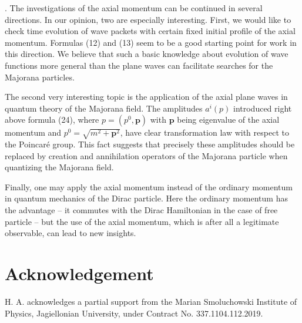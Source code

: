 \documentclass[12pt]{article}
\begin{document}
.   The  investigations of the axial momentum can be continued in several directions.  In our opinion, two are especially interesting. First,  we would like to check  time evolution of wave packets with certain fixed initial profile of the axial momentum.  Formulas (12) and (13) seem to be a good starting point for  work in this direction.  We believe that such a basic knowledge about evolution of wave functions more general than the plane waves can  facilitate searches for  the Majorana particles. 

The second  very interesting topic is the application of the axial plane waves  in quantum theory of the Majorana field. 
The amplitudes  $a^i(p)$ introduced right above formula (24),  where $p=(p^0, \mathbf{p})$ with  $\mathbf{p}$ being eigenvalue of the axial momentum and  $p^0 = \sqrt{m^2 + \mathbf{p}^2}$,   have clear transformation law with respect to the Poincar\'e  group.  This fact suggests that  precisely these amplitudes should be replaced by  creation and annihilation operators of the Majorana particle when quantizing the Majorana field. 

Finally, one may apply the axial momentum instead of the ordinary momentum in quantum mechanics of the Dirac particle.    Here the ordinary momentum    has the advantage -- it commutes  with the Dirac Hamiltonian  in the case of  free particle  --  but the use of  the axial momentum, which is after all  a legitimate observable,  can lead to new insights. 



\section{Acknowledgement}
H. A. acknowledges a partial support from the Marian Smoluchowski Institute of Physics, Jagiellonian University, under Contract No.  337.1104.112.2019.
\end{document}
